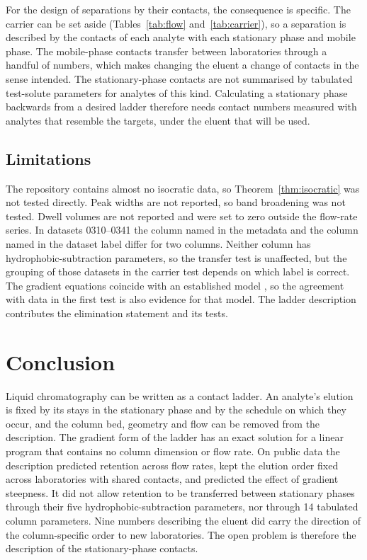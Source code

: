 \documentclass[11pt,a4paper]{article}
\theoremstyle{definition}
\theoremstyle{remark}
\begin{document}
For the design of separations by their contacts, the consequence is specific.
The carrier can be set aside (Tables~\ref{tab:flow} and~\ref{tab:carrier}), so a separation is described by the contacts of each analyte with each stationary phase and mobile phase.
The mobile-phase contacts transfer between laboratories through a handful of numbers, which makes changing the eluent a change of contacts in the sense intended.
The stationary-phase contacts are not summarised by tabulated test-solute parameters for analytes of this kind.
Calculating a stationary phase backwards from a desired ladder therefore needs contact numbers measured with analytes that resemble the targets, under the eluent that will be used.

\subsection{Limitations}

The repository contains almost no isocratic data, so Theorem~\ref{thm:isocratic} was not tested directly.
Peak widths are not reported, so band broadening was not tested.
Dwell volumes are not reported and were set to zero outside the flow-rate series.
In datasets 0310--0341 the column named in the metadata and the column named in the dataset label differ for two columns.
Neither column has hydrophobic-subtraction parameters, so the transfer test is unaffected, but the grouping of those datasets in the carrier test depends on which label is correct.
The gradient equations coincide with an established model \citep{snyder2007}, so the agreement with data in the first test is also evidence for that model.
The ladder description contributes the elimination statement and its tests.

\section{Conclusion}
\label{sec:conclusion}

Liquid chromatography can be written as a contact ladder.
An analyte's elution is fixed by its stays in the stationary phase and by the schedule on which they occur, and the column bed, geometry and flow can be removed from the description.
The gradient form of the ladder has an exact solution for a linear program that contains no column dimension or flow rate.
On public data the description predicted retention across flow rates, kept the elution order fixed across laboratories with shared contacts, and predicted the effect of gradient steepness.
It did not allow retention to be transferred between stationary phases through their five hydrophobic-subtraction parameters, nor through 14 tabulated column parameters.
Nine numbers describing the eluent did carry the direction of the column-specific order to new laboratories.
The open problem is therefore the description of the stationary-phase contacts.
\end{document}
